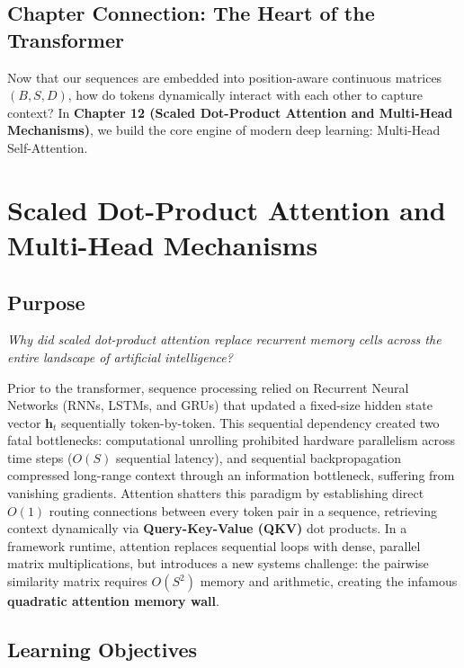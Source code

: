 \documentclass[
  letterpaper,
]{scrbook}
\begin{document}
\section{Chapter Connection: The Heart of the
Transformer}\label{chapter-connection-the-heart-of-the-transformer}

Now that our sequences are embedded into position-aware continuous
matrices \((B, S, D)\), how do tokens dynamically interact with each
other to capture context? In \textbf{Chapter 12 (Scaled Dot-Product
Attention and Multi-Head Mechanisms)}, we build the core engine of
modern deep learning: Multi-Head Self-Attention.

\chapter{Scaled Dot-Product Attention and Multi-Head
Mechanisms}\label{scaled-dot-product-attention-and-multi-head-mechanisms}

\section*{Purpose}\label{purpose-13}


\emph{Why did scaled dot-product attention replace recurrent memory
cells across the entire landscape of artificial intelligence?}

Prior to the transformer, sequence processing relied on Recurrent Neural
Networks (RNNs, LSTMs, and GRUs) that updated a fixed-size hidden state
vector \(\mathbf{h}_t\) sequentially token-by-token. This sequential
dependency created two fatal bottlenecks: computational unrolling
prohibited hardware parallelism across time steps (\(O(S)\) sequential
latency), and sequential backpropagation compressed long-range context
through an information bottleneck, suffering from vanishing gradients.
Attention shatters this paradigm by establishing direct \(O(1)\) routing
connections between every token pair in a sequence, retrieving context
dynamically via \textbf{Query-Key-Value (QKV)} dot products. In a
framework runtime, attention replaces sequential loops with dense,
parallel matrix multiplications, but introduces a new systems challenge:
the pairwise similarity matrix requires \(O(S^2)\) memory and
arithmetic, creating the infamous \textbf{quadratic attention memory
wall}.

\section{Learning Objectives}\label{learning-objectives-12}
\end{document}
